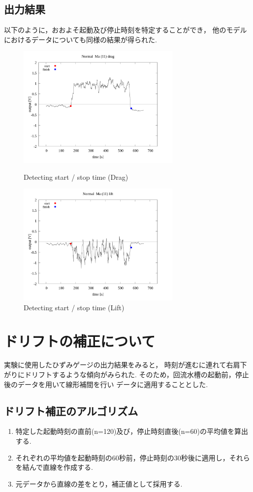 \documentclass[twocolumn,a4j]{jsarticle}
\begin{document}
\subsection{出力結果}
以下のように，おおよそ起動及び停止時刻を特定することができ，
他のモデルにおけるデータについても同様の結果が得られた.
\begin{figure}[htbp]
    \footnotesize
    \begin{center}
        \includegraphics[width=80mm]{images/Normal_ma(11)_drag_02.png}
        \caption{Detecting start / stop time (Drag)}
        \includegraphics[width=80mm]{images/Normal_ma(11)_lift_02.png}
        \caption{Detecting start / stop time (Lift)}
    \end{center}
\end{figure}
\newpage
\section{ドリフトの補正について}
実験に使用したひずみゲージの出力結果をみると，
時刻が進むに連れて右肩下がりにドリフトするような傾向がみられた.
そのため，回流水槽の起動前，停止後のデータを用いて線形補間を行い
データに適用することとした.

\subsection{ドリフト補正のアルゴリズム}
\begin{enumerate}[(1)]
    \item 特定した起動時刻の直前(n=120)及び，停止時刻直後(n=60)の平均値を算出する.
    \item それぞれの平均値を起動時刻の60秒前，停止時刻の30秒後に適用し，それらを結んで直線を作成する.
    \item 元データから直線の差をとり，補正値として採用する.
\end{enumerate}
\end{document}
